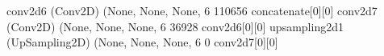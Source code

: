 \documentclass[letterpaper,10pt,english]{sphinxmanual}
\begin{document}
\begin{sphinxVerbatim}[commandchars=\\\{\}]
conv2d\PYGZus{}6 (Conv2D)               (None, None, None, 6 110656      concatenate[0][0]                
\PYGZus{}\PYGZus{}\PYGZus{}\PYGZus{}\PYGZus{}\PYGZus{}\PYGZus{}\PYGZus{}\PYGZus{}\PYGZus{}\PYGZus{}\PYGZus{}\PYGZus{}\PYGZus{}\PYGZus{}\PYGZus{}\PYGZus{}\PYGZus{}\PYGZus{}\PYGZus{}\PYGZus{}\PYGZus{}\PYGZus{}\PYGZus{}\PYGZus{}\PYGZus{}\PYGZus{}\PYGZus{}\PYGZus{}\PYGZus{}\PYGZus{}\PYGZus{}\PYGZus{}\PYGZus{}\PYGZus{}\PYGZus{}\PYGZus{}\PYGZus{}\PYGZus{}\PYGZus{}\PYGZus{}\PYGZus{}\PYGZus{}\PYGZus{}\PYGZus{}\PYGZus{}\PYGZus{}\PYGZus{}\PYGZus{}\PYGZus{}\PYGZus{}\PYGZus{}\PYGZus{}\PYGZus{}\PYGZus{}\PYGZus{}\PYGZus{}\PYGZus{}\PYGZus{}\PYGZus{}\PYGZus{}\PYGZus{}\PYGZus{}\PYGZus{}\PYGZus{}\PYGZus{}\PYGZus{}\PYGZus{}\PYGZus{}\PYGZus{}\PYGZus{}\PYGZus{}\PYGZus{}\PYGZus{}\PYGZus{}\PYGZus{}\PYGZus{}\PYGZus{}\PYGZus{}\PYGZus{}\PYGZus{}\PYGZus{}\PYGZus{}\PYGZus{}\PYGZus{}\PYGZus{}\PYGZus{}\PYGZus{}\PYGZus{}\PYGZus{}\PYGZus{}\PYGZus{}\PYGZus{}\PYGZus{}\PYGZus{}\PYGZus{}\PYGZus{}\PYGZus{}
conv2d\PYGZus{}7 (Conv2D)               (None, None, None, 6 36928       conv2d\PYGZus{}6[0][0]                   
\PYGZus{}\PYGZus{}\PYGZus{}\PYGZus{}\PYGZus{}\PYGZus{}\PYGZus{}\PYGZus{}\PYGZus{}\PYGZus{}\PYGZus{}\PYGZus{}\PYGZus{}\PYGZus{}\PYGZus{}\PYGZus{}\PYGZus{}\PYGZus{}\PYGZus{}\PYGZus{}\PYGZus{}\PYGZus{}\PYGZus{}\PYGZus{}\PYGZus{}\PYGZus{}\PYGZus{}\PYGZus{}\PYGZus{}\PYGZus{}\PYGZus{}\PYGZus{}\PYGZus{}\PYGZus{}\PYGZus{}\PYGZus{}\PYGZus{}\PYGZus{}\PYGZus{}\PYGZus{}\PYGZus{}\PYGZus{}\PYGZus{}\PYGZus{}\PYGZus{}\PYGZus{}\PYGZus{}\PYGZus{}\PYGZus{}\PYGZus{}\PYGZus{}\PYGZus{}\PYGZus{}\PYGZus{}\PYGZus{}\PYGZus{}\PYGZus{}\PYGZus{}\PYGZus{}\PYGZus{}\PYGZus{}\PYGZus{}\PYGZus{}\PYGZus{}\PYGZus{}\PYGZus{}\PYGZus{}\PYGZus{}\PYGZus{}\PYGZus{}\PYGZus{}\PYGZus{}\PYGZus{}\PYGZus{}\PYGZus{}\PYGZus{}\PYGZus{}\PYGZus{}\PYGZus{}\PYGZus{}\PYGZus{}\PYGZus{}\PYGZus{}\PYGZus{}\PYGZus{}\PYGZus{}\PYGZus{}\PYGZus{}\PYGZus{}\PYGZus{}\PYGZus{}\PYGZus{}\PYGZus{}\PYGZus{}\PYGZus{}\PYGZus{}\PYGZus{}\PYGZus{}
up\PYGZus{}sampling2d\PYGZus{}1 (UpSampling2D)  (None, None, None, 6 0           conv2d\PYGZus{}7[0][0]                   
\PYGZus{}\PYGZus{}\PYGZus{}\PYGZus{}\PYGZus{}\PYGZus{}\PYGZus{}\PYGZus{}\PYGZus{}\PYGZus{}\PYGZus{}\PYGZus{}\PYGZus{}\PYGZus{}\PYGZus{}\PYGZus{}\PYGZus{}\PYGZus{}\PYGZus{}\PYGZus{}\PYGZus{}\PYGZus{}\PYGZus{}\PYGZus{}\PYGZus{}\PYGZus{}\PYGZus{}\PYGZus{}\PYGZus{}\PYGZus{}\PYGZus{}\PYGZus{}\PYGZus{}\PYGZus{}\PYGZus{}\PYGZus{}\PYGZus{}\PYGZus{}\PYGZus{}\PYGZus{}\PYGZus{}\PYGZus{}\PYGZus{}\PYGZus{}\PYGZus{}\PYGZus{}\PYGZus{}\PYGZus{}\PYGZus{}\PYGZus{}\PYGZus{}\PYGZus{}\PYGZus{}\PYGZus{}\PYGZus{}\PYGZus{}\PYGZus{}\PYGZus{}\PYGZus{}\PYGZus{}\PYGZus{}\PYGZus{}\PYGZus{}\PYGZus{}\PYGZus{}\PYGZus{}\PYGZus{}\PYGZus{}\PYGZus{}\PYGZus{}\PYGZus{}\PYGZus{}\PYGZus{}\PYGZus{}\PYGZus{}\PYGZus{}\PYGZus{}\PYGZus{}\PYGZus{}\PYGZus{}\PYGZus{}\PYGZus{}\PYGZus{}\PYGZus{}\PYGZus{}\PYGZus{}\PYGZus{}\PYGZus{}\PYGZus{}\PYGZus{}\PYGZus{}\PYGZus{}\PYGZus{}\PYGZus{}\PYGZus{}\PYGZus{}\PYGZus{}\PYGZus{}

\end{sphinxVerbatim}
\end{document}
